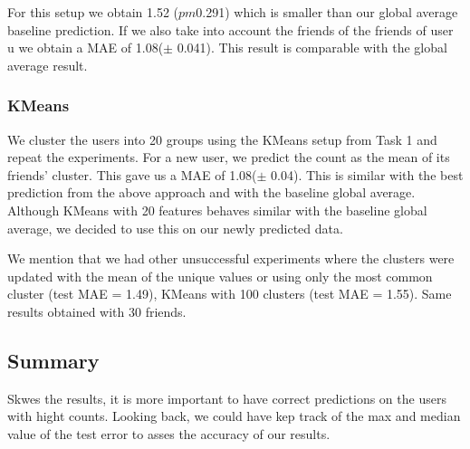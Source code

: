 For this setup  we obtain  1.52 ($pm$0.291) which is smaller than our global average baseline prediction.
If we also take into account the friends of the friends of user u we obtain  a MAE of 1.08($\pm$ 0.041). This result is comparable with the global average result.

\subsubsection{KMeans}
We cluster the users into 20 groups using the KMeans setup from Task 1
and repeat the experiments. For a new user, we predict the count as the  mean of its friends' cluster. This gave us a MAE of
1.08($\pm$ 0.04). This is similar with the best prediction from the above approach and with the baseline global average. 
Although KMeans with 20 features behaves similar with the baseline global average, we decided to use this on our newly predicted data.

We mention that we had other unsuccessful experiments where the clusters were updated with the mean of the unique values or using only the most common cluster (test MAE = 1.49), KMeans with 100 clusters (test MAE = 1.55). Same results obtained with 30 friends.

\subsection{Summary}
Skwes the results, it is more important to have correct predictions on the users with hight counts. Looking back, we could have kep track of the max and median value of the test error to asses the accuracy of our results.
